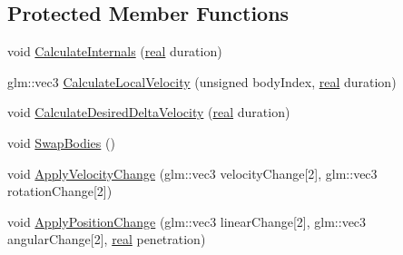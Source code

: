 \subsection*{Protected Member Functions}
\begin{DoxyCompactItemize}
\item 
void \hyperlink{classrum_1_1_contact_a69187a1397d9855d53b176640e2d4346}{Calculate\+Internals} (\hyperlink{namespacerum_a7e8cca23573d5eaead0f138cbaa4862c}{real} duration)
\item 
glm\+::vec3 \hyperlink{classrum_1_1_contact_ad10049d2987b416faf35fc84817e6a1c}{Calculate\+Local\+Velocity} (unsigned body\+Index, \hyperlink{namespacerum_a7e8cca23573d5eaead0f138cbaa4862c}{real} duration)
\item 
void \hyperlink{classrum_1_1_contact_a0b77ca13a132628887894b9842816e32}{Calculate\+Desired\+Delta\+Velocity} (\hyperlink{namespacerum_a7e8cca23573d5eaead0f138cbaa4862c}{real} duration)
\item 
void \hyperlink{classrum_1_1_contact_a26fd198d01eac4046fd6dfc36a6c2e89}{Swap\+Bodies} ()
\item 
void \hyperlink{classrum_1_1_contact_a1e4cac982b6b49f5720f9ef9ce039864}{Apply\+Velocity\+Change} (glm\+::vec3 velocity\+Change\mbox{[}2\mbox{]}, glm\+::vec3 rotation\+Change\mbox{[}2\mbox{]})
\item 
void \hyperlink{classrum_1_1_contact_acd9c12208d68554a2e81494b5677ce86}{Apply\+Position\+Change} (glm\+::vec3 linear\+Change\mbox{[}2\mbox{]}, glm\+::vec3 angular\+Change\mbox{[}2\mbox{]}, \hyperlink{namespacerum_a7e8cca23573d5eaead0f138cbaa4862c}{real} penetration)
\end{DoxyCompactItemize}
